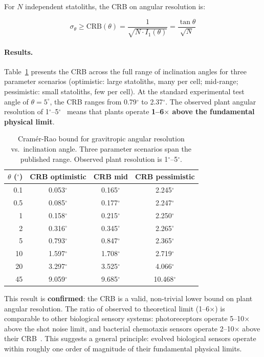 For $N$ independent statoliths, the CRB on angular resolution is:

\begin{equation}
    \sigma_\theta \geq \text{CRB}(\theta) = \frac{1}{\sqrt{N \cdot I_1(\theta)}} = \frac{\tan\theta}{\sqrt{N}}
\label{eq:crb_bound}
\end{equation}

\paragraph{Results.} Table~\ref{tab:crb_vs_angle} presents the CRB across the full range of inclination angles for three parameter scenarios (optimistic: large statoliths, many per cell; mid-range; pessimistic: small statoliths, few per cell). At the standard experimental test angle of $\theta = 5^\circ$, the CRB ranges from 0.79$^\circ$ to 2.37$^\circ$. The observed plant angular resolution of 1$^\circ$--5$^\circ$~\citep{chauvet2016} means that plants operate \textbf{1--6$\times$ above the fundamental physical limit}.

\begin{table}[htbp]
\centering
\caption{Cram\'{e}r-Rao bound for gravitropic angular resolution vs.\ inclination angle. Three parameter scenarios span the published range. Observed plant resolution is 1$^\circ$--5$^\circ$.}
\label{tab:crb_vs_angle}
\small
\begin{tabular}{@{}rccc@{}}
\toprule
$\theta$ ($^\circ$) & \textbf{CRB optimistic} & \textbf{CRB mid} & \textbf{CRB pessimistic} \\
\midrule
0.1 & 0.053$^\circ$ & 0.165$^\circ$ & 2.245$^\circ$ \\
0.5 & 0.085$^\circ$ & 0.177$^\circ$ & 2.247$^\circ$ \\
1 & 0.158$^\circ$ & 0.215$^\circ$ & 2.250$^\circ$ \\
2 & 0.316$^\circ$ & 0.345$^\circ$ & 2.265$^\circ$ \\
5 & 0.793$^\circ$ & 0.847$^\circ$ & 2.365$^\circ$ \\
10 & 1.597$^\circ$ & 1.708$^\circ$ & 2.719$^\circ$ \\
20 & 3.297$^\circ$ & 3.525$^\circ$ & 4.066$^\circ$ \\
45 & 9.059$^\circ$ & 9.685$^\circ$ & 10.468$^\circ$ \\
\bottomrule
\end{tabular}
\end{table}

This result is \textbf{confirmed}: the CRB is a valid, non-trivial lower bound on plant angular resolution. The ratio of observed to theoretical limit (1--6$\times$) is comparable to other biological sensory systems: photoreceptors operate 5--10$\times$ above the shot noise limit, and bacterial chemotaxis sensors operate 2--10$\times$ above their CRB~\citep{berg1977}. This suggests a general principle: evolved biological sensors operate within roughly one order of magnitude of their fundamental physical limits.

